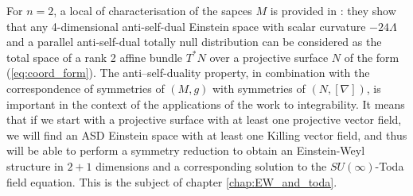 For $n=2$, a local of characterisation of the sapces $M$ is provided in
\cite{DM}: they show that any 4-dimensional anti-self-dual
Einstein space with scalar curvature $-24\Lambda$ and a parallel
anti-self-dual totally null distribution can be considered as the
total space of a rank 2 affine bundle $T^{*}N$ over a projective
surface $N$ of the form (\ref{eq:coord_form}). The anti--self-duality property, in combination with the correspondence of symmetries of $(M,g)$ with symmetries of $(N,[\nabla])$, is important in the context of the applications of
the work \cite{DM} to integrability. It means that
if we start with a projective surface with at least one projective
vector field, we will find an ASD Einstein space with at least one
Killing vector field, and thus will be able to perform a symmetry
reduction to obtain an Einstein-Weyl structure in $2+1$ dimensions
and a corresponding solution to the $SU(\infty)$-Toda field equation. This is the subject of chapter \ref{chap:EW_and_toda}.
